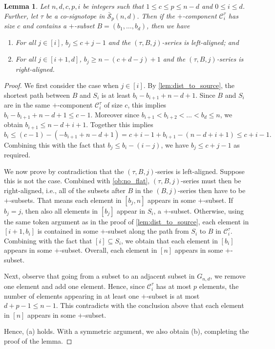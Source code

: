 \documentclass[a4paper,11pt]{amsart}
\newtheorem{lemma}[theorem]{Lemma}
\newcommand{\C}{\mathcal{C}}
\newcommand{\calS}{\mathcal{S}}
\begin{document}
\begin{lemma}
\label{lem:one_source_index}
    Let $n,d,c,p,i$ be integers such that $1 \leq c \leq p \leq n-d$ and $0 \leq i \leq d$.
    Further, let $\tau$ be a co-signotope in $\bar{\calS}_{p}(n,d)$.
    Then if the $+$-component $\C^{\tau}_i$ has size $c$ and contains a $+$-subset $B = (b_1, \dots, b_d)$, then we have
    \begin{enumerate}[label=(\alph*)]
        \item For all $j \in [i]$, $b_j \leq c+j-1$ and the $(\tau,B,j)$-series is left-aligned; and
        \item For all $j \in [i+1,d]$, $b_j \geq n-(c+d-j)+1$ and the $(\tau,B,j)$-series is right-aligned.
    \end{enumerate}
\end{lemma}
\begin{proof}
    We first consider the case when $j \in [i]$.
    By \cref{lem:dist_to_source}, the shortest path between $B$ and $S_i$ is at least $b_i - b_{i+1} + n - d+1$.
    Since $B$ and $S_i$ are in the same $+$-component $\C^{\tau}_i$ of size $c$, this implies $b_i - b_{i+1} + n - d+1 \leq c-1$.
    Moreover since $b_{i+1} < b_{i+2} < \dots < b_d \leq n$, we obtain $b_{i+1} \leq n-d+i+1$.
    Together this implies
    \[
    	b_i \leq (c-1) - (- b_{i+1} + n - d+1) = c+i-1 + b_{i+1} - (n-d+i+1) \leq c+i-1.
    \]
    Combining this with the fact that $b_j \leq b_i - (i-j)$, we have $b_j \leq c+j-1$ as required.

    We now prove by contradiction that the $(\tau,B,j)$-series is left-aligned.
    Suppose this is not the case.
    Combined with \cref{ob:no_flat}, $(\tau,B,j)$-series must then be right-aligned, i.e., all of the subsets after $B$ in the $(B,j)$-series then have to be $+$-subsets.
    That means each element in $[b_j,n]$ appears in some $+$-subset.
    If $b_j = j$, then also all elements in $[b_j]$ appear in $S_i$, a $+$-subset.
    Otherwise, using the same token argument as in the proof of \cref{lem:dist_to_source}, each element in $[i+1,b_i]$ is contained in some $+$-subset along the path from $S_i$ to $B$ in $\C^{\tau}_i$.
    Combining with the fact that $[i] \subseteq S_i$, we obtain that each element in $[b_i]$ appears in some $+$-subset.
    Overall, each element in $[n]$ appears in some $+$-subset.

    Next, observe that going from a subset to an adjacent subset in $G_{n,d}$, we remove one element and add one element.
    Hence, since $\C^{\tau}_i$ has at most $p$ elements, the number of elements appearing in at least one $+$-subset is at most $d+p-1 \leq n-1$.
    This contradicts with the conclusion above that each element in $[n]$ appears in some $+$-subset.

    Hence, (a) holds.
    With a symmetric argument, we also obtain (b), completing the proof of the lemma.
\end{proof}
\end{document}
